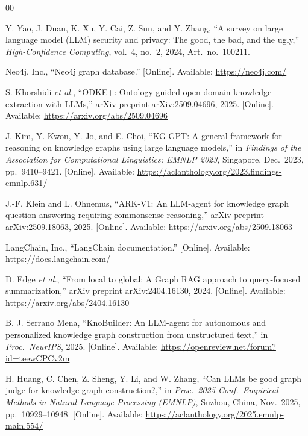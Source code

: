 \documentclass[conference]{IEEEtran}
\begin{document}
\begin{thebibliography}{00}

Y. Yao, J. Duan, K. Xu, Y. Cai, Z. Sun, and Y. Zhang, ``A survey on large language model (LLM) security and privacy: The good, the bad, and the ugly,'' \textit{High-Confidence Computing}, vol.~4, no.~2, 2024, Art.\ no.\ 100211.

Neo4j, Inc., ``Neo4j graph database.'' [Online]. Available: \url{https://neo4j.com/}

S. Khorshidi \textit{et al.}, ``ODKE+: Ontology-guided open-domain knowledge extraction with LLMs,'' arXiv preprint arXiv:2509.04696, 2025. [Online]. Available: \url{https://arxiv.org/abs/2509.04696}

J. Kim, Y. Kwon, Y. Jo, and E. Choi, ``KG-GPT: A general framework for reasoning on knowledge graphs using large language models,'' in \textit{Findings of the Association for Computational Linguistics: EMNLP 2023}, Singapore, Dec.\ 2023, pp.\ 9410--9421. [Online]. Available: \url{https://aclanthology.org/2023.findings-emnlp.631/}

J.-F. Klein and L. Ohnemus, ``ARK-V1: An LLM-agent for knowledge graph question answering requiring commonsense reasoning,'' arXiv preprint arXiv:2509.18063, 2025. [Online]. Available: \url{https://arxiv.org/abs/2509.18063}

LangChain, Inc., ``LangChain documentation.'' [Online]. Available: \url{https://docs.langchain.com/}

D. Edge \textit{et al.}, ``From local to global: A Graph RAG approach to query-focused summarization,'' arXiv preprint arXiv:2404.16130, 2024. [Online]. Available: \url{https://arxiv.org/abs/2404.16130}

B. J. Serrano Mena, ``KnoBuilder: An LLM-agent for autonomous and personalized knowledge graph construction from unstructured text,'' in \textit{Proc.\ NeurIPS}, 2025. [Online]. Available: \url{https://openreview.net/forum?id=teewCPCv2m}

H. Huang, C. Chen, Z. Sheng, Y. Li, and W. Zhang, ``Can LLMs be good graph judge for knowledge graph construction?,'' in \textit{Proc.\ 2025 Conf.\ Empirical Methods in Natural Language Processing (EMNLP)}, Suzhou, China, Nov.\ 2025, pp.\ 10929--10948. [Online]. Available: \url{https://aclanthology.org/2025.emnlp-main.554/}


\end{thebibliography}
\end{document}
